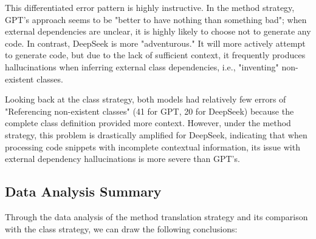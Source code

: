 This differentiated error pattern is highly instructive. In the method strategy, GPT's approach seems to be "better to have nothing than something bad"; when external dependencies are unclear, it is highly likely to choose not to generate any code. In contrast, DeepSeek is more "adventurous." It will more actively attempt to generate code, but due to the lack of sufficient context, it frequently produces hallucinations when inferring external class dependencies, i.e., "inventing" non-existent classes.

Looking back at the class strategy, both models had relatively few errors of "Referencing non-existent classes" (41 for GPT, 20 for DeepSeek) because the complete class definition provided more context. However, under the method strategy, this problem is drastically amplified for DeepSeek, indicating that when processing code snippets with incomplete contextual information, its issue with external dependency hallucinations is more severe than GPT's.

\subsection{Data Analysis Summary}
Through the data analysis of the method translation strategy and its comparison with the class strategy, we can draw the following conclusions:

